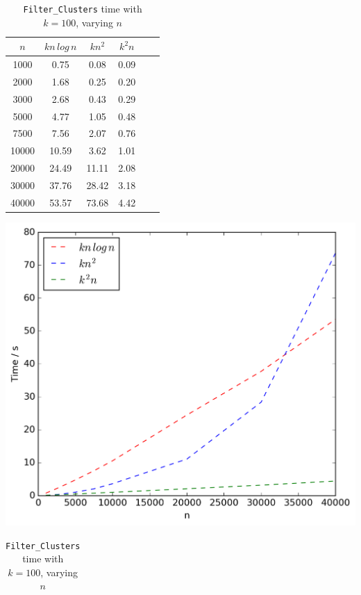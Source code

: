 \documentclass[12pt,a4paper]{article}
\begin{document}
\begin{table}[!ht]
\begin{minipage}{0.48\textwidth}
            \label{tab:weightn2}
            \begin{tabular}{c||ccccc}
                $n$ & $kn\,log\,n$ & $kn^2$ & $k^2n$\\
                \hline\hline
                1000 & 0.75 & 0.08 & 0.09\\
                2000 & 1.68 & 0.25 & 0.20\\
                3000 & 2.68 & 0.43 & 0.29\\
                5000 & 4.77 & 1.05 & 0.48\\
                7500 & 7.56 & 2.07 & 0.76\\
                10000 & 10.59 & 3.62 & 1.01\\
                20000 & 24.49 & 11.11 & 2.08\\
                30000 & 37.76 & 28.42 & 3.18\\
                40000 & 53.57 & 73.68 & 4.42\\
            \end{tabular}
            \includegraphics[scale=0.4]{varyingn2_weighting}
        \end{minipage}\hfill
        \begin{minipage}{0.49\textwidth}
            \centering
            \caption[Runtime of \texttt{Filter\_Clusters} in Scenario 2, with $k = 100$ and varying $n$]{\texttt{Filter\_Clusters} time with $k = 100$, varying $n$}
            \label{tab:filtern2}
            \begin{tabular}{c||ccccc}

\end{tabular}
\end{minipage}
\end{table}
\end{document}
